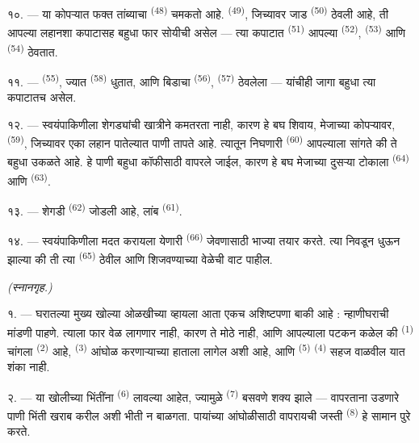 १०. --- या कोपऱ्यात फक्त तांब्याचा  \textsuperscript{(48)} चमकतो आहे. 
\textsuperscript{(49)}, जिच्यावर जाड  \textsuperscript{(50)} ठेवली आहे, ती आपल्या
लहानशा कपाटासह बहुधा फार सोयीची असेल — त्या कपाटात 
\textsuperscript{(51)} आपल्या  \textsuperscript{(52)}, 
\textsuperscript{(53)} आणि  \textsuperscript{(54)} ठेवतात.

\VUsaut{4.0mm}
\VUsaut{3.0mm}

११. ---  \textsuperscript{(55)}, ज्यात  \textsuperscript{(58)}
धुतात, आणि बिडाचा  \textsuperscript{(56)},  \textsuperscript{(57)}
ठेवलेला — यांचीही जागा बहुधा त्या कपाटातच असेल.

१२. --- स्वयंपाकिणीला शेगड्यांची खात्रीने कमतरता नाही, कारण हे बघ शिवाय, मेजाच्या कोपऱ्यावर,
 \textsuperscript{(59)}, जिच्यावर एका लहान पातेल्यात पाणी तापते आहे.
त्यातून निघणारी  \textsuperscript{(60)} आपल्याला सांगते की ते बहुधा उकळते आहे. हे
पाणी बहुधा कॉफीसाठी वापरले जाईल, कारण हे बघ मेजाच्या दुसऱ्या टोकाला 
\textsuperscript{(64)} आणि  \textsuperscript{(63)}.

१३. --- शेगडी  \textsuperscript{(62)} जोडली आहे, लांब
 \textsuperscript{(61)}.

१४. --- स्वयंपाकिणीला मदत करायला येणारी  \textsuperscript{(66)}
जेवणासाठी भाज्या तयार करते. त्या निवडून धुऊन झाल्या की ती त्या 
\textsuperscript{(65)} ठेवील आणि शिजवण्याच्या वेळेची वाट पाहील.

\VUsaut{4.0mm}
{\centering\fontsize{10.2pt}{10.2pt}\selectfont{} \textit{(स्नानगृह.)}\par}
\VUsaut{3.0mm}

१. --- घरातल्या मुख्य खोल्या ओळखीच्या व्हायला आता एकच अशिष्टपणा बाकी आहे : न्हाणीघराची मांडणी
पाहणे. त्याला फार वेळ लागणार नाही, कारण ते मोठे नाही, आणि आपल्याला पटकन कळेल की 
\textsuperscript{(1)} चांगला  \textsuperscript{(2)} आहे,
 \textsuperscript{(3)} आंघोळ करणाऱ्याच्या हाताला लागेल अशी आहे, आणि
 \textsuperscript{(5)}  \textsuperscript{(4)} सहज
वाळवील यात शंका नाही.

२. --- या खोलीच्या भिंतींना  \textsuperscript{(6)} लावल्या आहेत,
ज्यामुळे  \textsuperscript{(7)} बसवणे शक्य झाले — वापरताना उडणारे पाणी भिंती खराब
करील अशी भीती न बाळगता. पायांच्या आंघोळीसाठी वापरायची जस्ती 
\textsuperscript{(8)} हे सामान पुरे करते.

\VUsaut{6.0mm}
\VUfilet{22mm}
